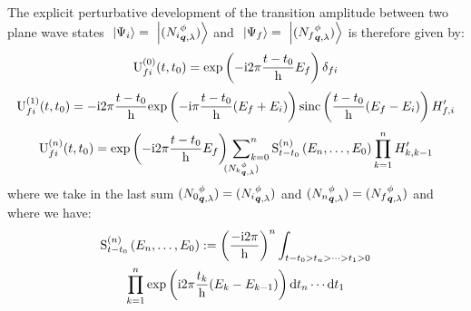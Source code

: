 \documentclass[10pt,a4paper,twoside,openany]{book}
\begin{document}
The explicit perturbative development of the transition amplitude between two plane wave states $\ket{\Psi_i} = \ket{\bFQ {N_i} \pt \q \sp}$ and $\ket{\Psi_f} = \ket{\bFQ {N_f} \pt \q \sp}$ is therefore given by:
\begin{equation*}
\Umn f i 0 t {t_0} = \exp{-\i 2 \pi \frac{t - t_0} \h E_f} \delta_{f i}
\end{equation*}
\begin{equation*}
\Umn f i 1 t {t_0} = -\i 2 \pi \frac{t - t_0} \h \exp{-\i \pi \frac{t - t_0} \h ( E_f + E_i )} \sinc{\frac{t - t_0} \h ( E_f - E_i )} H'_{f,i}
\end{equation*}
\begin{equation*}
\Umn f i n t {t_0} = \exp{-\i 2 \pi \frac{t - t_0} \h E_f} \sideset{}{_{k=0}^n}\sum_{\bFQ {N_k} \pt \q \sp} \SmE n {E_n, \dotsc, E_0} \prod_{k=1}^n H'_{k,k-1}
\end{equation*}
where we take in the last sum $\bFQ {N_0} \pt \q \sp = \bFQ {N_i} \pt \q \sp$ and $\bFQ {N_n} \pt \q \sp = \bFQ {N_f} \pt \q \sp$ and where we have:
\begin{multline*}
\SmE n {E_n, \dotsc, E_0} \eqdef \left( \frac{-\i 2 \pi} \h \right)^n \int_{t - t_0 > t_n > \dotsb > t_1 > 0} \\
\prod_{k=1}^n \exp{\i 2 \pi \frac{t_k} \h ( E_k - E_{k - 1} )} \dt_n \dotsm \dt_1
\end{multline*}
\end{document}
